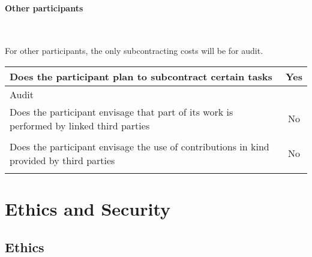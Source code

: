 \documentclass[noworkareas,deliverables,\classoptions]{euproposal}       %
\begin{document}
\begin{proposal}
\paragraph{Other participants}\ 

For other participants, the only subcontracting costs will be for audit.

\bgroup
\def\arraystretch{1.5}  %
\noindent \begin{tabular}{|p{}|c|}
\hline
Does the participant plan to subcontract certain
tasks & Yes \\
\hline
\multicolumn{2}{|l|}{Audit} \\
\hline
Does the participant envisage that part of its work
is performed by linked third parties & No \\
\hline
\multicolumn{2}{|l|}{} \\
\hline
Does the participant envisage the use of
contributions in kind provided by
third parties & No \\
\hline
\multicolumn{2}{|l|}{} \\
\hline
\end{tabular}
\egroup



\newpage

\section{Ethics and Security}


\subsection{Ethics}


\end{proposal}
\end{document}
